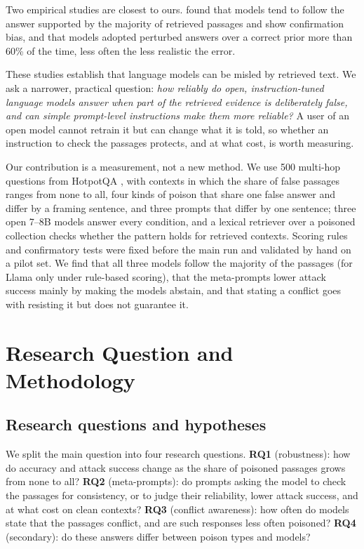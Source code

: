 \documentclass[pdflatex,sn-mathphys-ay]{sn-jnl}
\begin{document}
Two empirical studies are closest to ours. \citet{jin2024tugofwar} found that
models tend to follow the answer supported by the majority of retrieved
passages and show confirmation bias, and \citet{wu2024clasheval} that models
adopted perturbed answers over a correct prior more than 60\% of the time,
less often the less realistic the error.

These studies establish that language models can be misled by retrieved text.
We ask a narrower, practical question: \emph{how reliably do open,
instruction-tuned language models answer when part of the retrieved evidence
is deliberately false, and can simple prompt-level instructions make them
more reliable?} A user of an open model cannot retrain it but can change what
it is told, so whether an instruction to check the passages protects, and at
what cost, is worth measuring.

Our contribution is a measurement, not a new method. We use 500 multi-hop
questions from HotpotQA \citep{yang2018hotpotqa}, with contexts in which the
share of false passages ranges from none to all, four kinds of poison that
share one false answer and differ by a framing sentence, and three prompts
that differ by one sentence; three open 7--8B models answer every condition,
and a lexical retriever over a poisoned collection checks whether the pattern holds for retrieved contexts. Scoring rules and confirmatory tests were fixed before the
main run and validated by hand on a pilot set. We find that all three models follow the majority of the passages (for Llama only under rule-based scoring), that the meta-prompts lower attack
success mainly by making the models abstain, and that stating a conflict goes
with resisting it but does not guarantee it.

\section{Research Question and Methodology}\label{sec:method}

\subsection{Research questions and hypotheses}\label{sec:rqs}
We split the main question into four research questions. \textbf{RQ1}
(robustness): how do accuracy and attack success change as the share of
poisoned passages grows from none to all? \textbf{RQ2} (meta-prompts): do
prompts asking the model to check the passages for consistency, or to judge
their reliability, lower attack success, and at what cost on clean contexts?
\textbf{RQ3} (conflict awareness): how often do models state that the passages
conflict, and are such responses less often poisoned? \textbf{RQ4}
(secondary): do these answers differ between poison types and models?
\end{document}
